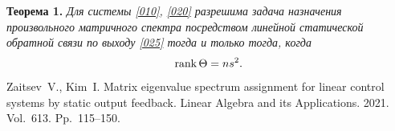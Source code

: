 {\bf Теорема 1.} {\it Для системы \eqref{010},
\eqref{020} разрешима задача назначения произвольного матричного
спектра посредством линейной статической обратной связи по выходу
\eqref{025} тогда и только тогда, когда}
\begin{equation*}
 {\rm rank}\,\Theta = ns^2.
\end{equation*}








%

%

\begin{thebibliography}{9} %
 Zaitsev~V., Kim~I. Matrix eigenvalue spectrum assignment for linear control systems by
static output feedback. Linear Algebra and its Applications. 2021.
Vol.~613. Pp.~115--150. 

\end{thebibliography}





%

